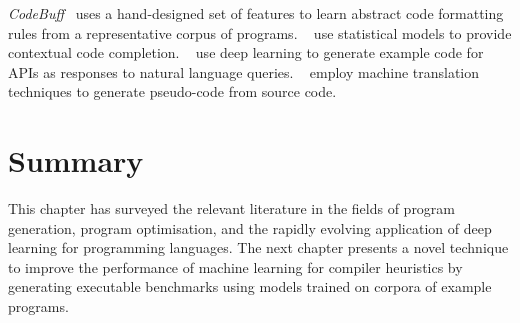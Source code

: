 \emph{CodeBuff}~\cite{Terence2016} uses a hand-designed set of features to learn abstract code formatting rules from a representative corpus of programs. \citeauthor{Raychev2014}~\cite{Raychev2014} use statistical models to provide contextual code completion. \citeauthor{Zhang2015a}~\cite{Zhang2015a} use deep learning to generate example code for APIs as responses to natural language queries. \citeauthor{Oda2015}~\cite{Oda2015} employ machine translation techniques to generate pseudo-code from source code.


\section{Summary}
\label{sec:related-work-summary}

This chapter has surveyed the relevant literature in the fields of program generation, program optimisation, and the rapidly evolving application of deep learning for programming languages. The next chapter presents a novel technique to improve the performance of machine learning for compiler heuristics by generating executable benchmarks using models trained on corpora of example programs.
